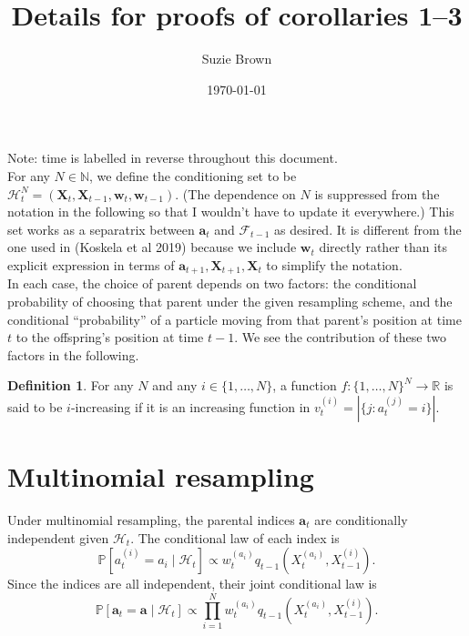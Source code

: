 \documentclass[fleqn]{article}
\title{Details for proofs of corollaries 1--3}
\author{Suzie Brown}
\date{\today}
\theoremstyle{definition}
\newtheorem{defn}{Definition}
\newcommand{\PR}{\mathbb{P}}
\newcommand{\1}[1]{\mathbbm{1}_{\{#1\}}}
\newcommand{\vt}[2][t]{v_{#1}^{(#2)}}
\newcommand{\wt}[2][t]{w_{#1}^{(#2)}}
\begin{document}
\maketitle
\thispagestyle{fancy}
Note: time is labelled in reverse throughout this document.\\

For any $N\in \mathbb{N}$, we define the conditioning set to be $\mathcal{H}_t^N = (\mathbf{X}_t, \mathbf{X}_{t-1}, \mathbf{w}_t, \mathbf{w}_{t-1})$. (The dependence on $N$ is suppressed from the notation in the following so that I wouldn't have to update it everywhere.) This set works as a separatrix between $\mathbf{a}_{t}$ and $\mathcal{F}_{t-1}$ as desired. It is different from the one used in (Koskela et al 2019) because we include $\mathbf{w}_t$ directly rather than its explicit expression in terms of $\mathbf{a}_{t+1}, \mathbf{X}_{t+1}, \mathbf{X}_t$ to simplify the notation.\\

In each case, the choice of parent depends on two factors: the conditional probability of choosing that parent under the given resampling scheme, and the conditional ``probability'' of a particle moving from that parent's position at time $t$ to the offspring's position at time $t-1$. We see the contribution of these two factors in the following.

\begin{defn}
For any $N$ and any $i\in\{1,\dots,N\}$, a function $f: \{1,\dots,N\}^N \to \mathbb{R}$ is said to be $i$-increasing if it is an increasing function in $\vt{i} = |\{j : a_t^{(j)} = i \}|$.
\end{defn}

\section*{Multinomial resampling}

Under multinomial resampling, the parental indices $\mathbf{a}_t$ are conditionally independent given $\mathcal{H}_t$. The conditional law of each index is
\begin{equation*}
\PR [a_t^{(i)} = a_i \mid \mathcal{H}_t] \propto \wt{a_i} q_{t-1}(X_t^{(a_i)}, X_{t-1}^{(i)}).
\end{equation*}
Since the indices are all independent, their joint conditional law is
\begin{equation*}
\PR [\mathbf{a}_t = \mathbf{a} \mid \mathcal{H}_t] \propto \prod_{i=1}^N \wt{a_i} q_{t-1}(X_t^{(a_i)}, X_{t-1}^{(i)}).
\end{equation*}
\end{document}
